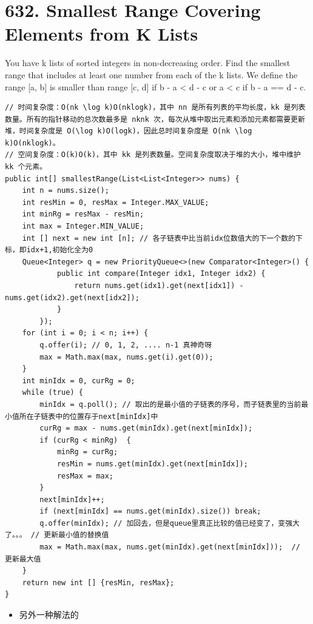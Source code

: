 \documentclass[9pt, b5paaper]{book}
\begin{document}
\section{632. Smallest Range Covering Elements from K Lists}
\label{sec-14-2}
You have k lists of sorted integers in non-decreasing order. Find the smallest range that includes at least one number from each of the k lists.
We define the range [a, b] is smaller than range [c, d] if b - a < d - c or a < c if b - a == d - c.
\begin{verbatim}
// 时间复杂度：O(nk \log k)O(nklogk)，其中 nn 是所有列表的平均长度，kk 是列表数量。所有的指针移动的总次数最多是 nknk 次，每次从堆中取出元素和添加元素都需要更新堆，时间复杂度是 O(\log k)O(logk)，因此总时间复杂度是 O(nk \log k)O(nklogk)。
// 空间复杂度：O(k)O(k)，其中 kk 是列表数量。空间复杂度取决于堆的大小，堆中维护 kk 个元素。
public int[] smallestRange(List<List<Integer>> nums) {
    int n = nums.size();
    int resMin = 0, resMax = Integer.MAX_VALUE;
    int minRg = resMax - resMin;
    int max = Integer.MIN_VALUE;
    int [] next = new int [n]; // 各子链表中比当前idx位数值大的下一个数的下标，即idx+1,初始化全为0
    Queue<Integer> q = new PriorityQueue<>(new Comparator<Integer>() {
            public int compare(Integer idx1, Integer idx2) {
                return nums.get(idx1).get(next[idx1]) - nums.get(idx2).get(next[idx2]);
            }
        });
    for (int i = 0; i < n; i++) {
        q.offer(i); // 0, 1, 2, .... n-1 真神奇呀
        max = Math.max(max, nums.get(i).get(0));
    }
    int minIdx = 0, curRg = 0;
    while (true) {
        minIdx = q.poll(); // 取出的是最小值的子链表的序号，而子链表里的当前最小值所在子链表中的位置存于next[minIdx]中
        curRg = max - nums.get(minIdx).get(next[minIdx]);
        if (curRg < minRg)  {
            minRg = curRg;
            resMin = nums.get(minIdx).get(next[minIdx]);
            resMax = max;
        }
        next[minIdx]++;
        if (next[minIdx] == nums.get(minIdx).size()) break;
        q.offer(minIdx); // 加回去，但是queue里真正比较的值已经变了，变强大了。。。 // 更新最小值的替换值 
        max = Math.max(max, nums.get(minIdx).get(next[minIdx]));  // 更新最大值
    }
    return new int [] {resMin, resMax};
}
\end{verbatim}
\begin{itemize}
\item 另外一种解法的
\end{itemize}
\end{document}
